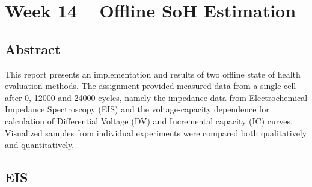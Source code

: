 

\chapter{Week 14 -- Offline SoH Estimation}




\section{Abstract}
This report presents an implementation and results of two offline state of health evaluation methods. The assignment provided measured data from a single cell after 0, 12000 and 24000 cycles, namely the impedance data from Electrochemical Impedance Spectroscopy (EIS) and the voltage-capacity dependence for calculation of Differential Voltage (DV) and Incremental capacity (IC) curves. Visualized samples from individual experiments were compared both qualitatively and quantitatively.


\section{EIS}

